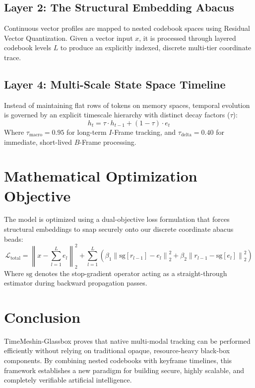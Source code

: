 \documentclass{article}
\begin{document}
\subsection{Layer 2: The Structural Embedding Abacus}
Continuous vector profiles are mapped to nested codebook spaces using Residual Vector Quantization. Given a vector input $x$, it is processed through layered codebook levels $L$ to produce an explicitly indexed, discrete multi-tier coordinate trace.

\subsection{Layer 4: Multi-Scale State Space Timeline}
Instead of maintaining flat rows of tokens on memory spaces, temporal evolution is governed by an explicit timescale hierarchy with distinct decay factors ($\tau$):
\begin{equation}
h_t = \tau \cdot h_{t-1} + (1 - \tau) \cdot e_t
\end{equation}
Where $\tau_{\text{macro}} = 0.95$ for long-term $I$-Frame tracking, and $\tau_{\text{delta}} = 0.40$ for immediate, short-lived $B$-Frame processing.

\section{Mathematical Optimization Objective}
The model is optimized using a dual-objective loss formulation that forces structural embeddings to snap securely onto our discrete coordinate abacus beads:
\begin{equation}
\mathcal{L}_{\text{total}} = \left\| x - \sum_{l=1}^L e_l \right\|_2^2 + \sum_{l=1}^{L} \left( \beta_1 \left\| \text{sg}[r_{l-1}] - e_l \right\|_2^2 + \beta_2 \left\| r_{l-1} - \text{sg}[e_l] \right\|_2^2 \right)
\end{equation}
Where $\text{sg}$ denotes the stop-gradient operator acting as a straight-through estimator during backward propagation passes.

\section{Conclusion}
TimeMeshin-Glassbox proves that native multi-modal tracking can be performed efficiently without relying on traditional opaque, resource-heavy black-box components. By combining nested codebooks with keyframe timelines, this framework establishes a new paradigm for building secure, highly scalable, and completely verifiable artificial intelligence.
\end{document}
